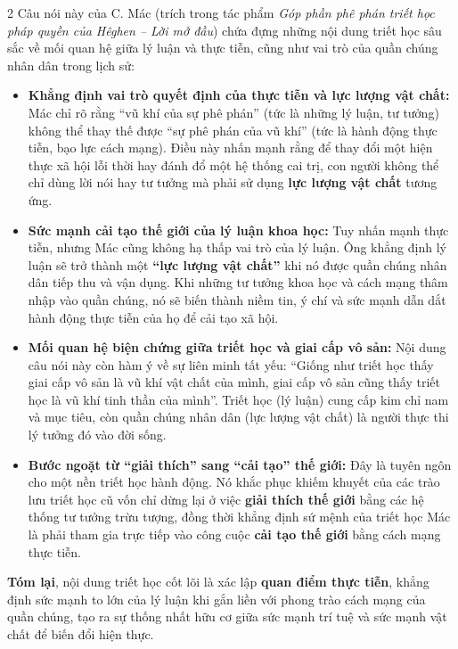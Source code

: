 \documentclass[9pt,a4paper]{extarticle}
\begin{document}
\begin{multicols*}{2}
Câu nói này của C. Mác (trích trong tác phẩm \textit{Góp phần phê phán triết học pháp quyền của Hêghen -- Lời mở đầu}) chứa đựng những nội dung triết học sâu sắc về mối quan hệ giữa lý luận và thực tiễn, cũng như vai trò của quần chúng nhân dân trong lịch sử:

\begin{itemize}
\item \textbf{Khẳng định vai trò quyết định của thực tiễn và lực lượng vật chất:} Mác chỉ rõ rằng ``vũ khí của sự phê phán'' (tức là những lý luận, tư tưởng) không thể thay thế được ``sự phê phán của vũ khí'' (tức là hành động thực tiễn, bạo lực cách mạng). Điều này nhấn mạnh rằng để thay đổi một hiện thực xã hội lỗi thời hay đánh đổ một hệ thống cai trị, con người không thể chỉ dùng lời nói hay tư tưởng mà phải sử dụng \textbf{lực lượng vật chất} tương ứng.
\item \textbf{Sức mạnh cải tạo thế giới của lý luận khoa học:} Tuy nhấn mạnh thực tiễn, nhưng Mác cũng không hạ thấp vai trò của lý luận. Ông khẳng định lý luận sẽ trở thành một \textbf{``lực lượng vật chất''} khi nó được quần chúng nhân dân tiếp thu và vận dụng. Khi những tư tưởng khoa học và cách mạng thâm nhập vào quần chúng, nó sẽ biến thành niềm tin, ý chí và sức mạnh dẫn dắt hành động thực tiễn của họ để cải tạo xã hội.
\item \textbf{Mối quan hệ biện chứng giữa triết học và giai cấp vô sản:} Nội dung câu nói này còn hàm ý về sự liên minh tất yếu: ``Giống như triết học thấy giai cấp vô sản là vũ khí vật chất của mình, giai cấp vô sản cũng thấy triết học là vũ khí tinh thần của mình''. Triết học (lý luận) cung cấp kim chỉ nam và mục tiêu, còn quần chúng nhân dân (lực lượng vật chất) là người thực thi lý tưởng đó vào đời sống.
\item \textbf{Bước ngoặt từ ``giải thích'' sang ``cải tạo'' thế giới:} Đây là tuyên ngôn cho một nền triết học hành động. Nó khắc phục khiếm khuyết của các trào lưu triết học cũ vốn chỉ dừng lại ở việc \textbf{giải thích thế giới} bằng các hệ thống tư tưởng trừu tượng, đồng thời khẳng định sứ mệnh của triết học Mác là phải tham gia trực tiếp vào công cuộc \textbf{cải tạo thế giới} bằng cách mạng thực tiễn.
\end{itemize}

\textbf{Tóm lại}, nội dung triết học cốt lõi là xác lập \textbf{quan điểm thực tiễn}, khẳng định sức mạnh to lớn của lý luận khi gắn liền với phong trào cách mạng của quần chúng, tạo ra sự thống nhất hữu cơ giữa sức mạnh trí tuệ và sức mạnh vật chất để biến đổi hiện thực.


\end{multicols*}
\end{document}
